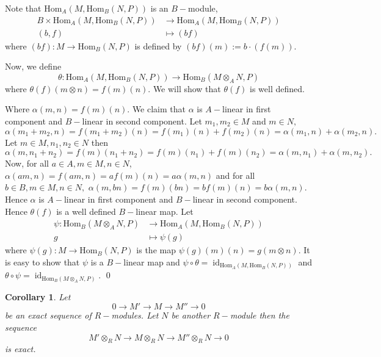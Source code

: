 \documentclass[11pt]{amsart}
\newtheorem{corollary}[theorem]{Corollary}%
\newcommand{\Homa}[1]{\text{Hom}_A\left(#1\right)}
\newcommand{\Homb}[1]{\text{Hom}_B\left(#1\right)}
\DeclareMathOperator{\id}{\text{id}}
\begin{document}
\proof Note that $\Homa{M,\Homb{N,P}}$ is an $B-$module, \begin{align*}
B\times \Homa{M,\Homb{N,P}}&\to \Homa{M,\Homb{N,P}}\\
(b,f)&\mapsto (bf)
\end{align*}
where $(bf):M\to \Homb{N,P}$ is defined by $(bf)(m):=b\cdot(f(m)).$

Now, we define $$\theta:\Homa{M,\Homb{N,P}}\to \Homb{M\otimes_A N,P}$$ where $\theta(f)(m\otimes n)=f(m)(n).$ We will show that $\theta(f)$ is well defined. 

\begin{center}


\end{center}

Where $\alpha(m,n)=f(m)(n).$ We claim that $\alpha$ is $A-$linear in first component and $B-$linear in second component. Let $m_1,m_2\in  M$ and $m\in N,$ $\alpha(m_1+m_2,n)=f(m_1+m_2)(n)=f(m_1)(n)+f(m_2)(n)=\alpha(m_1,n)+\alpha(m_2,n).$ Let $m\in M, n_1,n_2\in N$ then $\alpha(m,n_1+n_2)=f(m)(n_1+n_2)=f(m)(n_1)+f(m)(n_2)=\alpha(m,n_1)+\alpha(m,n_2).$ Now, for all $a\in A,m\in M,n\in N$, $\alpha(am,n)=f(am,n)=af(m)(n)=a\alpha(m,n)$ and for all $b\in B, m\in M,n\in N,$ $\alpha(m,bn)=f(m)(bn)=bf(m)(n)=b\alpha(m,n)$. Hence $\alpha$ is $A-$linear in first component and $B-$linear in second component. Hence $\theta(f)$ is a well defined $B-$linear map. Let \begin{align*}
\psi:\Homb{M\otimes_A N,P}&\to \Homa{M,\Homb{N,P}}\\
g&\mapsto \psi(g)
\end{align*}
where $\psi(g):M\to \Homb{N,P}$ is the map $\psi(g)(m)(n)=g(m\otimes n).$ It is easy to show that $\psi$ is a $B-$linear map and $\psi\circ \theta=\id_{\Homa{M,\Homb{N,P}}}$ and $\theta\circ \psi=\id_{\Homb{M\otimes_A N,P}}.$ \qed

\begin{corollary}

Let \begin{equation}
0\to M'\to M\to M''\to 0
\end{equation} 
be an exact sequence of $R-$modules. Let $N$ be another $R-$module then the sequence 
\begin{equation}
M'\otimes_R N\to M\otimes_R N\to M''\otimes_R N\to 0
\end{equation} 
is exact.

\end{corollary}
\end{document}
